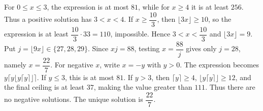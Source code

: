For $0\le x\le3$, the expression is at most $81$, while for $x\ge4$ it is at least $256$. Thus a positive solution has $3<x<4$. If $x\ge\dfrac{10}{3}$, then $\lfloor3x\rfloor\ge10$, so the expression is at least $\dfrac{10}{3}\cdot33=110$, impossible. Hence $3<x<\dfrac{10}{3}$ and $\lfloor3x\rfloor=9$. Put $j=\lfloor9x\rfloor\in\{27,28,29\}$. Since $xj=88$, testing $x=\dfrac{88}{j}$ gives only $j=28$, namely $x=\dfrac{22}{7}$. For negative $x$, write $x=-y$ with $y>0$. The expression becomes $y\lceil y\lfloor y\lceil y\rceil\rfloor\rceil$. If $y\le3$, this is at most $81$. If $y>3$, then $\lceil y\rceil\ge4$, $\lfloor y\lceil y\rceil\rfloor\ge12$, and the final ceiling is at least $37$, making the value greater than $111$. Thus there are no negative solutions. The unique solution is $\boxed{\dfrac{22}{7}}$.
